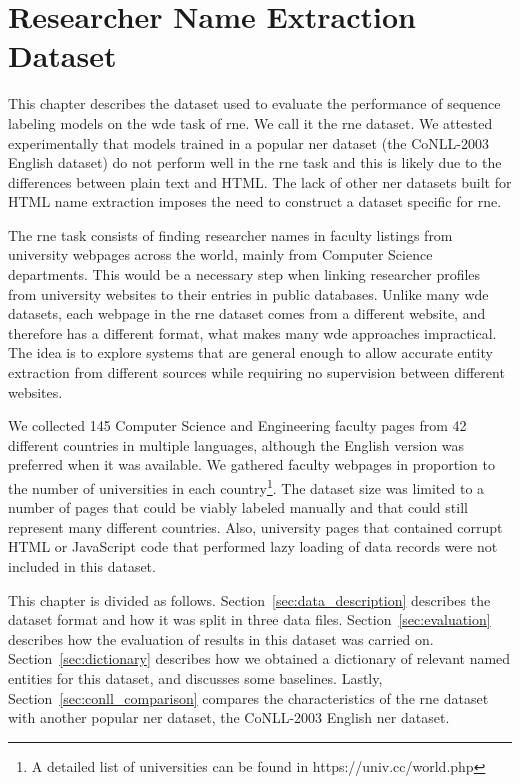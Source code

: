\documentclass{nle}
\begin{document}
\section{Researcher Name Extraction Dataset}
\label{cha:dataset}

This chapter describes the dataset used to evaluate the performance of sequence labeling models
on the \gls{wde} task of \gls{rne}. We call it the \gls{rne} dataset.
We attested experimentally that 
models trained in a popular \gls{ner} dataset (the {CoNLL-2003} English dataset) do not perform 
well in the \gls{rne} task and this is likely due to the differences
between plain text and HTML. The lack of other \gls{ner} 
datasets built for HTML name extraction imposes the need to construct a dataset specific for \gls{rne}.

The \gls{rne} task consists of finding researcher names in faculty listings from university 
webpages across the world, mainly from Computer Science departments.
This would be a necessary step when linking researcher profiles from university 
websites to their entries in public databases. Unlike many
\gls{wde} datasets, each webpage in the \gls{rne} dataset comes from a different 
website, and therefore has a different format, what makes many \gls{wde}
approaches impractical. The idea is to explore systems that are general 
enough to allow accurate entity extraction from different sources while requiring
no supervision between different websites. 

We collected 145 Computer Science and Engineering faculty pages from 42 different countries in
multiple languages, although the English version was preferred when it was available.
We gathered faculty webpages in proportion to
the number of universities in each country\footnote{A detailed list of universities can
be found in https://univ.cc/world.php}. 
The dataset size was limited to a number of pages that could be viably labeled manually and
that could still represent many different countries. 
Also, university pages that contained 
corrupt HTML or JavaScript code that performed lazy loading of data records were
not included in this dataset.

This chapter is divided as follows. Section~\ref{sec:data_description} describes the 
dataset format and how it was split in
three data files. 
Section~\ref{sec:evaluation} describes how the evaluation of results in this 
dataset was carried on. 
Section~\ref{sec:dictionary} describes how we obtained a dictionary
of relevant named entities for this dataset, and discusses some baselines.
Lastly,
Section~\ref{sec:conll_comparison} compares the characteristics of the \gls{rne} dataset
with another popular \gls{ner} dataset, the {CoNLL-2003} English \gls{ner} dataset.
\end{document}
